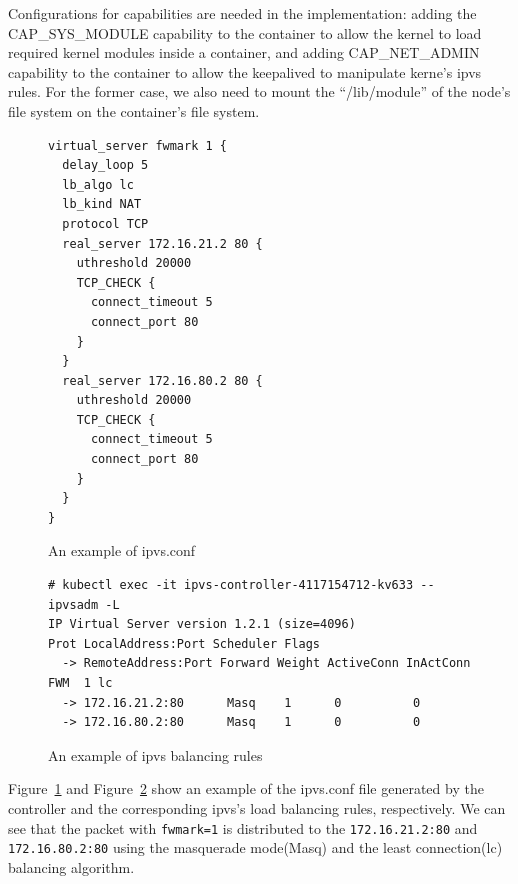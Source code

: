 
Configurations for capabilities are needed in the implementation: adding the CAP\_SYS\_MODULE capability 
to the container to allow the kernel to load required kernel modules inside a container, 
and adding CAP\_NET\_ADMIN capability to the container to allow the keepalived to manipulate kerne's ipvs rules. 
For the former case, we also need to mount the \enquote{/lib/module} of the node's file system on the container's file system.

\begin{figure}
\begin{minipage}{0.7\columnwidth}
\begin{verbatim}
virtual_server fwmark 1 {
  delay_loop 5
  lb_algo lc
  lb_kind NAT
  protocol TCP
  real_server 172.16.21.2 80 {
    uthreshold 20000
    TCP_CHECK {
      connect_timeout 5
      connect_port 80
    }
  }
  real_server 172.16.80.2 80 {
    uthreshold 20000
    TCP_CHECK {
      connect_timeout 5
      connect_port 80
    }
  }
}
\end{verbatim}
\end{minipage}
\caption{An example of ipvs.conf}
\label{fig:ipvs.conf}
\end{figure}

\begin{figure}
\begin{minipage}{\columnwidth}
\small
\begin{verbatim}
# kubectl exec -it ipvs-controller-4117154712-kv633 -- ipvsadm -L
IP Virtual Server version 1.2.1 (size=4096)
Prot LocalAddress:Port Scheduler Flags
  -> RemoteAddress:Port Forward Weight ActiveConn InActConn
FWM  1 lc
  -> 172.16.21.2:80      Masq    1      0          0         
  -> 172.16.80.2:80      Masq    1      0          0
\end{verbatim}
\end{minipage}
\caption{An example of ipvs balancing rules}
\label{fig:ipvs rule}
\end{figure}


Figure~\ref{fig:ipvs.conf} and Figure~\ref{fig:ipvs rule} show an example of the ipvs.conf file 
generated by the controller and the corresponding ipvs's load balancing rules, respectively.
We can see that the packet with {\tt fwmark=1}\cite{BertHubert2002} is distributed 
to the {\tt 172.16.21.2:80} and {\tt 172.16.80.2:80} 
using the masquerade mode(Masq) and 
the least connection(lc)\cite{Zhang2000} balancing algorithm. 

